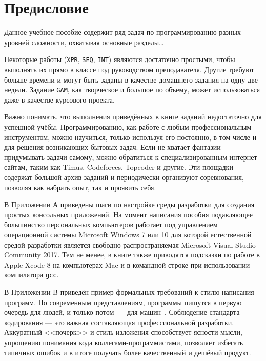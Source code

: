 \chapter{Предисловие}

Данное учебное пособие содержит ряд задач по программированию разных уровней сложности,
охватывая основные разделы\dots


Некоторые работы (\texttt{XPR}, \texttt{SEQ}, \texttt{INT}) являются достаточно простыми, чтобы
выполнять их прямо в классе под руководством преподавателя. Другие требуют больше времени и могут
быть заданы в качестве домашнего задания на одну-две недели. Задание \texttt{GAM}, как творческое и
большое по объему, может использоваться даже в качестве курсового проекта.

Важно понимать, что выполнения приведённых в книге заданий недостаточно для успешной учёбы.
Программированию, как работе с любым профессиональным инструментом, можно научиться, только
используя его постоянно, в том числе и для решения возникающих бытовых задач. Если не хватает
фантазии придумывать задачи самому, можно обратиться к специализированным интернет-сайтам,
таким как Timus, Codeforces, Topcoder и другие. Эти площадки содержат большой архив заданий
и периодически организуют соревнования, позволяя как набрать опыт, так и проявить себя.

В Приложении А приведены шаги по настройке среды разработки для создания простых консольных приложений.
На момент написания пособия подавляющее большинство
персональных компьютеров работает под управлением операционной системы Microsoft Windows 7 или 10 для
которой естественной средой разработки является свободно распространяемая Microsoft Visual Studio Community 2017.
Тем не менее, в книге также приводятся подсказки по работе в Apple Xcode 8 на компьютерах Mac и
в командной строке при использовании компилятора \texttt{gcc}.

В Приложении B приведён пример формальных требований к стилю написания программ.
По современным представлениям, программы пишутся в первую очередь для людей, и только потом~---
для машин~\cite{mcconnel2015code}. Соблюдение стандарта кодирования --- это важная составляющая
профессиональной разработки. Аккуратный <<почерк>> и стиль изложения способствует ясности мысли,
упрощению понимания кода коллегами-программистами, позволяет избегать типичных ошибок
и в итоге получать более качественный и дешёвый продукт.
